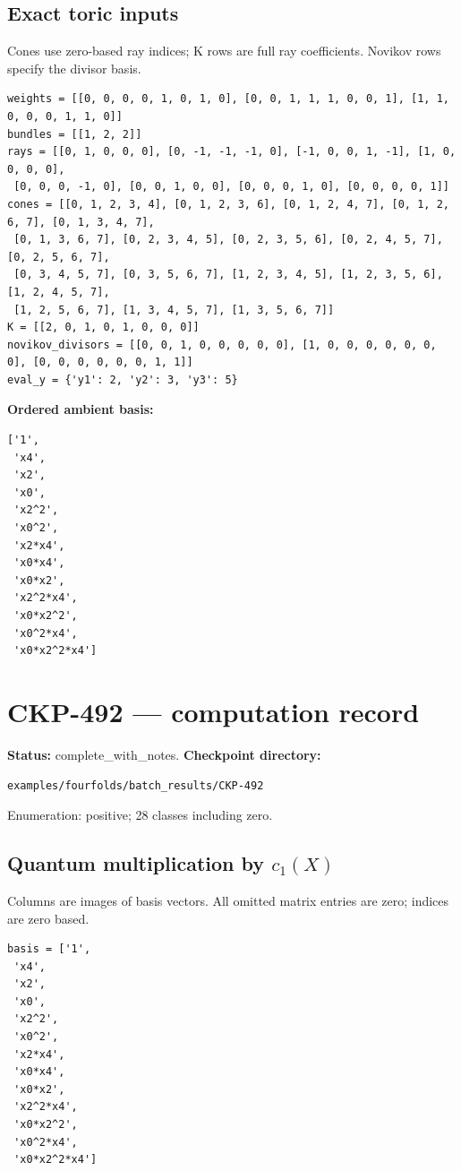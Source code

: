 \documentclass[10pt,a4paper]{article}
\begin{document}
\subsection*{Exact toric inputs}
Cones use zero-based ray indices; K rows are full ray coefficients. Novikov rows specify the divisor basis.

\begin{lstlisting}
weights = [[0, 0, 0, 0, 1, 0, 1, 0], [0, 0, 1, 1, 1, 0, 0, 1], [1, 1, 0, 0, 0, 1, 1, 0]]
bundles = [[1, 2, 2]]
rays = [[0, 1, 0, 0, 0], [0, -1, -1, -1, 0], [-1, 0, 0, 1, -1], [1, 0, 0, 0, 0],
 [0, 0, 0, -1, 0], [0, 0, 1, 0, 0], [0, 0, 0, 1, 0], [0, 0, 0, 0, 1]]
cones = [[0, 1, 2, 3, 4], [0, 1, 2, 3, 6], [0, 1, 2, 4, 7], [0, 1, 2, 6, 7], [0, 1, 3, 4, 7],
 [0, 1, 3, 6, 7], [0, 2, 3, 4, 5], [0, 2, 3, 5, 6], [0, 2, 4, 5, 7], [0, 2, 5, 6, 7],
 [0, 3, 4, 5, 7], [0, 3, 5, 6, 7], [1, 2, 3, 4, 5], [1, 2, 3, 5, 6], [1, 2, 4, 5, 7],
 [1, 2, 5, 6, 7], [1, 3, 4, 5, 7], [1, 3, 5, 6, 7]]
K = [[2, 0, 1, 0, 1, 0, 0, 0]]
novikov_divisors = [[0, 0, 1, 0, 0, 0, 0, 0], [1, 0, 0, 0, 0, 0, 0, 0], [0, 0, 0, 0, 0, 0, 1, 1]]
eval_y = {'y1': 2, 'y2': 3, 'y3': 5}
\end{lstlisting}

\textbf{Ordered ambient basis:}
\begin{lstlisting}
['1',
 'x4',
 'x2',
 'x0',
 'x2^2',
 'x0^2',
 'x2*x4',
 'x0*x4',
 'x0*x2',
 'x2^2*x4',
 'x0*x2^2',
 'x0^2*x4',
 'x0*x2^2*x4']
\end{lstlisting}

\clearpage\section*{CKP-492 --- computation record}
\textbf{Status:} complete\_with\_notes.
\textbf{Checkpoint directory:}
\begin{lstlisting}
examples/fourfolds/batch_results/CKP-492
\end{lstlisting}

Enumeration: positive; 28 classes including zero.
\subsection*{Quantum multiplication by $c_1(X)$}
Columns are images of basis vectors. All omitted matrix entries are zero; indices are zero based.

\begin{lstlisting}
basis = ['1',
 'x4',
 'x2',
 'x0',
 'x2^2',
 'x0^2',
 'x2*x4',
 'x0*x4',
 'x0*x2',
 'x2^2*x4',
 'x0*x2^2',
 'x0^2*x4',
 'x0*x2^2*x4']
\end{lstlisting}
\end{document}
